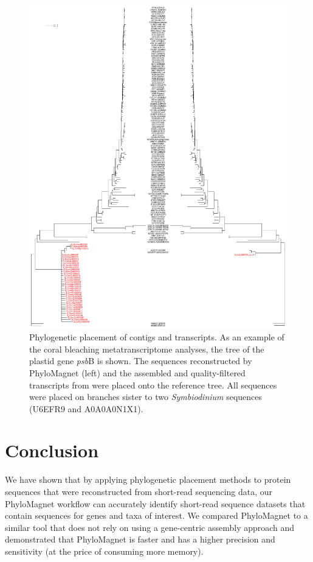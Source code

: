 \documentclass[a4paper]{article}
\begin{document}
\begin{figure}[!tpb]%
\centerline{\includegraphics[width=.9\textwidth]{Fig4.pdf}}
\caption{Phylogenetic placement of contigs and transcripts. As an example of the coral bleaching metatranscriptome analyses, the tree of the plastid gene \textit{psb}B is shown. The sequences reconstructed by PhyloMagnet (left) and the assembled and quality-filtered transcripts from \citet[][right]{Frazier2017} were placed onto the reference tree. All sequences were placed on branches sister to two \textit{Symbiodinium} sequences (U6EFR9 and A0A0A0N1X1).}\label{fig:04}
\end{figure}

\section{Conclusion}
We have shown that by applying phylogenetic placement methods to protein sequences that were reconstructed from short-read sequencing data, our PhyloMagnet workflow can accurately identify short-read sequence datasets that contain sequences for genes and taxa of interest. We compared PhyloMagnet to a similar tool that does not rely on using a gene-centric assembly approach and demonstrated that PhyloMagnet is faster and has a higher precision and sensitivity (at the price of consuming more memory). 
\end{document}
